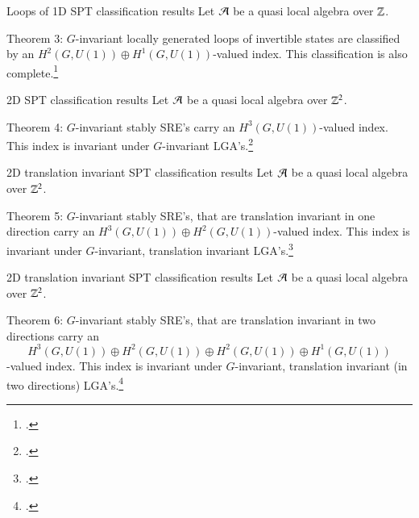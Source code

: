 \documentclass{beamer}
\begin{document}
\begin{frame}{Loops of 1D SPT classification results}
Let $\AA$ be a quasi local algebra over $\ZZ$.
\begin{block}{Theorem 3:}
$G$-invariant locally generated loops of invertible states are classified by an $H^2(G,U(1))\oplus H^1(G,U(1))$-valued index. This classification is also complete.\footcite{https://doi.org/10.48550/arxiv.2204.03763}
\end{block}
\end{frame}

\begin{frame}{2D SPT classification results}
Let $\AA$ be a quasi local algebra over $\ZZ^2$.
\begin{block}{Theorem 4:}
$G$-invariant stably SRE's carry an $H^3(G,U(1))$-valued index. This index is invariant under $G$-invariant LGA's.\footcite{ogata2021h3gmathbb}
\end{block}
\end{frame}

\begin{frame}{2D translation invariant SPT classification results}
Let $\AA$ be a quasi local algebra over $\ZZ^2$.
\begin{block}{Theorem 5:}
$G$-invariant stably SRE's, that are translation invariant in one direction carry an $H^3(G,U(1))\oplus H^2(G,U(1))$-valued index. This index is invariant under $G$-invariant, translation invariant LGA's.\footcite{https://doi.org/10.48550/arxiv.2202.11758}
\end{block}
\end{frame}

\begin{frame}{2D translation invariant SPT classification results}
Let $\AA$ be a quasi local algebra over $\ZZ^2$.
\begin{block}{Theorem 6:}
$G$-invariant stably SRE's, that are translation invariant in two directions carry an
\[H^3(G,U(1))\oplus H^2(G,U(1))\oplus H^2(G,U(1))\oplus H^1(G,U(1))\]
-valued index. This index is invariant under $G$-invariant, translation invariant (in two directions) LGA's.\footcite{https://doi.org/10.48550/arxiv.2202.11758}
\end{block}
\end{frame}
\end{document}
